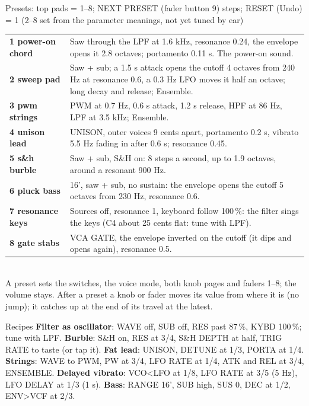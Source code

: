 \documentclass{article}
\begin{document}
\vspace{1.5mm}
\begin{minipage}[t]{150mm}\vspace{0pt}
\begin{card}{Presets: top pads = 1--8; NEXT PRESET (fader button 9) steps; RESET (Undo) = 1 \quad\textmd{\fontsize{6.5}{7}\selectfont (2--8 set from the parameter meanings, not yet tuned by ear)}}
\fontsize{7.2}{8.7}\selectfont
\begin{tabularx}{\linewidth}{@{}>{\bfseries}l L@{}}
1 power-on chord & Saw through the LPF at 1.6 kHz, resonance 0.24, the envelope opens it 2.8 octaves; portamento 0.11 s. The power-on sound. \\
2 sweep pad & Saw + sub; a 1.5 s attack opens the cutoff 4 octaves from 240 Hz at resonance 0.6, a 0.3 Hz LFO moves it half an octave; long decay and release; Ensemble. \\
3 pwm strings & PWM at 0.7 Hz, 0.6 s attack, 1.2 s release, HPF at 86 Hz, LPF at 3.5 kHz; Ensemble. \\
4 unison lead & UNISON, outer voices 9 cents apart, portamento 0.2 s, vibrato 5.5 Hz fading in after 0.6 s; resonance 0.45. \\
5 s\&h burble & Saw + sub, S\&H on: 8 steps a second, up to 1.9 octaves, around a resonant 900 Hz. \\
6 pluck bass & 16', saw + sub, no sustain: the envelope opens the cutoff 5 octaves from 230 Hz, resonance 0.6. \\
7 resonance keys & Sources off, resonance 1, keyboard follow 100\,\%: the filter sings the keys (C4 about 25 cents flat: tune with LPF). \\
8 gate stabs & VCA GATE, the envelope inverted on the cutoff (it dips and opens again), resonance 0.5. \\
\end{tabularx}\\[0.3mm]
A preset sets the switches, the voice mode, both knob pages and faders 1--8; the volume stays.
After a preset a knob or fader moves its value from where it is (no jump); it catches up at the end of its travel at the latest.
\end{card}

\begin{card}{Recipes}
\fontsize{7.4}{9.0}\selectfont
\textbf{Filter as oscillator}: WAVE off, SUB off, RES past 87\,\%, KYBD 100\,\%; tune with LPF.\quad
\textbf{Burble}: S\&H on, RES at 3/4, S\&H DEPTH at half, TRIG RATE to taste (or tap it).\quad
\textbf{Fat lead}: UNISON, DETUNE at 1/3, PORTA at 1/4.\quad
\textbf{Strings}: WAVE to PWM, PW at 3/4, LFO RATE at 1/4, ATK and REL at 3/4, ENSEMBLE.\quad
\textbf{Delayed vibrato}: VCO<LFO at 1/8, LFO RATE at 3/5 (5 Hz), LFO DELAY at 1/3 (1 s).\quad
\textbf{Bass}: RANGE 16', SUB high, SUS 0, DEC at 1/2, ENV>VCF at 2/3.
\end{card}
\end{minipage}\hfill
\end{document}
